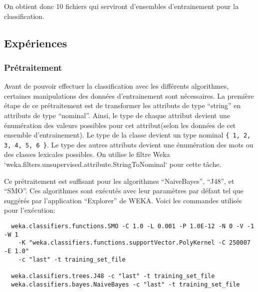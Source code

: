 \documentclass[11pt]{article} %
\begin{document}
On obtient donc 10 fichiers qui serviront d'ensembles d'entrainement pour la classification.

\subsection{ Expériences }
\subsubsection{ Prétraitement }
Avant de pouvoir effectuer la classification avec les différents algorithmes, certaines manipulations des données d'entrainement sont nécessaires.
La première étape de ce prétraitement est de transformer les attributs de type ``string'' en attributs de type ``nominal''. 
Ainsi, le type de chaque attribut devient une énumération des valeurs possibles pour cet attribut(selon les données de cet ensemble d'entrainement).
Le type de la classe devient un type nominal \texttt{\{ 1, 2, 3, 4, 5, 6 \}}.
Le type des autres attributs devient une énumération des mots ou des classes lexicales possibles.
On utilise le filtre Weka `weka.filters.unsupervised.attribute.StringToNominal` pour cette tâche.

Ce prétraitement est suffisant pour les algorithmes ``NaiveBayes'', ``J48'', et ``SMO''.
Ces algorithmes sont exécutés avec leur paramètres par défaut tel que suggérés par l'application ``Explorer'' de WEKA.
Voici les commandes utilisés pour l'exécution:
\begin{verbatim}
  weka.classifiers.functions.SMO -C 1.0 -L 0.001 -P 1.0E-12 -N 0 -V -1 -W 1 
    -K "weka.classifiers.functions.supportVector.PolyKernel -C 250007 -E 1.0" 
    -c "last" -t training_set_file 
    
  weka.classifiers.trees.J48 -c "last" -t training_set_file 
  weka.classifiers.bayes.NaiveBayes -c "last" -t training_set_file
\end{verbatim}
\end{document}
